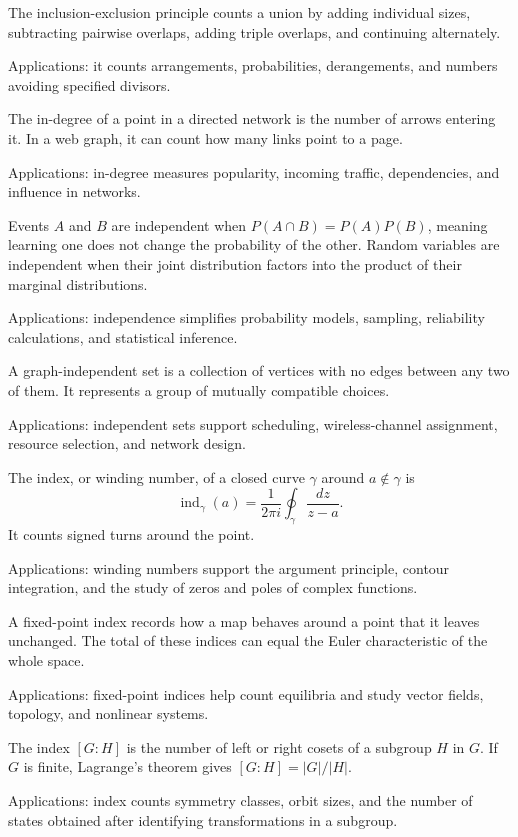 The inclusion-exclusion principle counts a union by adding individual sizes, subtracting pairwise overlaps, adding triple overlaps, and continuing alternately. \par\noindent Applications: it counts arrangements, probabilities, derangements, and numbers avoiding specified divisors.

The in-degree of a point in a directed network is the number of arrows entering it. In a web graph, it can count how many links point to a page. \par\noindent Applications: in-degree measures popularity, incoming traffic, dependencies, and influence in networks.

Events $A$ and $B$ are independent when $P(A\cap B)=P(A)P(B)$, meaning learning one does not change the probability of the other. Random variables are independent when their joint distribution factors into the product of their marginal distributions. \par\noindent Applications: independence simplifies probability models, sampling, reliability calculations, and statistical inference.

A graph-independent set is a collection of vertices with no edges between any two of them. It represents a group of mutually compatible choices. \par\noindent Applications: independent sets support scheduling, wireless-channel assignment, resource selection, and network design.

The index, or winding number, of a closed curve $\gamma$ around $a\notin\gamma$ is
\[
\operatorname{ind}_\gamma(a)=\frac{1}{2\pi i}\oint_\gamma\frac{dz}{z-a}.
\]
It counts signed turns around the point. \par\noindent Applications: winding numbers support the argument principle, contour integration, and the study of zeros and poles of complex functions.

A fixed-point index records how a map behaves around a point that it leaves unchanged. The total of these indices can equal the Euler characteristic of the whole space. \par\noindent Applications: fixed-point indices help count equilibria and study vector fields, topology, and nonlinear systems.

The index $[G:H]$ is the number of left or right cosets of a subgroup $H$ in $G$. If $G$ is finite, Lagrange's theorem gives $[G:H]=|G|/|H|$. \par\noindent Applications: index counts symmetry classes, orbit sizes, and the number of states obtained after identifying transformations in a subgroup.

